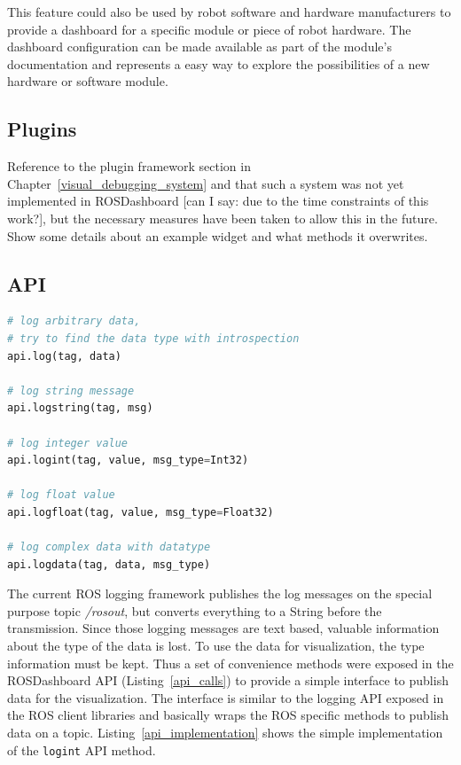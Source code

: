 This feature could also be used by robot software and hardware manufacturers to provide a dashboard for a specific module or piece of robot hardware. The dashboard configuration can be made available as part of the module's documentation and represents a easy way to explore the possibilities of a new hardware or software module.

\subsection{Plugins}
Reference to the plugin framework section in Chapter~\ref{visual_debugging_system} and that such a system was not yet implemented in ROSDashboard [can I say: due to the time constraints of this work?], but the necessary measures have been taken to allow this in the future. Show some details about an example widget and what methods it overwrites.

\subsection{API}
\label{api_section}

\begin{lstlisting}[float,frame=single,caption={ROSDashboard API methods.},label=api_calls,language=Python]
# log arbitrary data,
# try to find the data type with introspection
api.log(tag, data)

# log string message
api.logstring(tag, msg)

# log integer value
api.logint(tag, value, msg_type=Int32)

# log float value
api.logfloat(tag, value, msg_type=Float32)

# log complex data with datatype
api.logdata(tag, data, msg_type)
\end{lstlisting}

The current ROS logging framework publishes the log messages on the special purpose topic \emph{/rosout}, but converts everything to a String before the transmission. Since those logging messages are text based, valuable information about the type of the data is lost. To use the data for visualization, the type information must be kept. Thus a set of convenience methods were exposed in the ROSDashboard API (Listing~\ref{api_calls}) to provide a simple interface to publish data for the visualization. The interface is similar to the logging API exposed in the ROS client libraries and basically wraps the ROS specific methods to publish data on a topic. Listing~\ref{api_implementation} shows the simple implementation of the \verb+logint+ API method.

